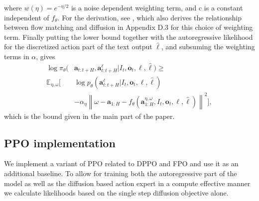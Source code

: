 \documentclass[conference]{IEEEtran}
\newcommand{\ba}{\mathbf{a}}
\newcommand{\bo}{\mathbf{o}}
\newcommand{\lang}{\ell}
\newcommand{\rawtext}{\hat{\ell}} %
\begin{document}
where $w(\eta) = e^{-\eta/2}$ is a noise dependent weighting term, and c is a constant independent of $f_\theta$. For the derivation, see \citep{KingaDiffELBO}, which also derives the relationship between flow matching and diffusion in Appendix D.3 for this choice of weighting term.
Finally putting the lower bound together with the autoregressive likelihood for the discretized action part of the text output $\rawtext$, and subsuming the weighting terms in $\alpha$, gives  
\begin{equation}
\begin{aligned}
    \log \pi_\theta(&\ba_{t:t+H}, \ba^{\lang}_{t:t+H} \vert I_t, \bo_t, \lang, \hat{\ell}) \geq \\  \mathbb{E}_{\eta, \omega} \Big[&  \log p_\theta(\ba^{\lang}_{t:t+H} | I_t, \bo_t, \lang, \hat{\ell})
     \\ &- \alpha_\eta \left\|\omega - \ba_{1:H} - f_\theta(\ba^{\eta, \omega}_{1:H}, I_t, \bo_t, \lang, \hat{\ell})\right\|^2 \Big],
\end{aligned}
\label{eq:likelihood_bound_appendix}
\end{equation}
which is the bound given in the main part of the paper.

\subsection{PPO implementation}
\label{sect:ppo}
We implement a variant of PPO \citep{schulman2017proximal} related to DPPO and FPO \citep{Ren2025DPPO,mcallister2025fpo} and use it as an additional baseline. To allow for training both the autoregressive part of the model as well as the diffusion based action expert in a compute effective manner we calculate likelihoods based on the single step diffusion objective alone. 
\end{document}

